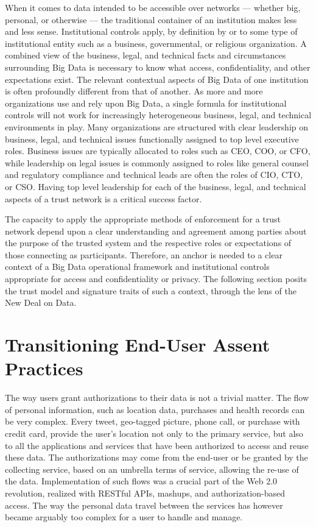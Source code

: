 When it comes to data intended to be accessible over networks --- whether big, personal, or otherwise --- the traditional container of an institution makes less and less sense.
Institutional controls apply, by definition by or to some type of institutional entity such as a business, governmental, or religious organization.
A combined view of the business, legal, and technical facts and circumstances surrounding Big Data is necessary to know what access, confidentiality, and other expectations exist.
The relevant contextual aspects of Big Data of one institution is often profoundly different from that of another.
As more and more organizations use and rely upon Big Data, a single formula for institutional controls will not work for increasingly heterogeneous business, legal, and technical environments in play.
Many organizations are structured with clear leadership on business, legal, and technical issues functionally assigned to top level executive roles. 
Business issues are typically allocated to roles such as CEO, COO, or CFO, while leadership on legal issues is commonly assigned to roles like general counsel and regulatory compliance and technical leads are often the roles of CIO, CTO, or CSO.
Having top level leadership for each of the business, legal, and technical aspects of a trust network is a critical success factor.

The capacity to apply the appropriate methods of enforcement for a trust network depend upon a clear understanding and agreement among parties about the purpose of the trusted system and the respective roles or expectations of those connecting as participants.
Therefore, an anchor is needed to a clear context of a Big Data operational framework and institutional controls appropriate for access and confidentiality or privacy.
The following section posits the trust model and signature traits of such a context, through the lens of the New Deal on Data.

\section{Transitioning End-User Assent Practices }

The way users grant authorizations to their data is not a trivial matter.
The flow of personal information, such as location data, purchases and health records can be very complex.
Every tweet, geo-tagged picture, phone call, or purchase with credit card, provide the user's location not only to the primary service, but also to all the applications and services that have been authorized to access and reuse these data.
The authorizations may come from the end-user or be granted by the collecting service, based on an umbrella terms of service, allowing the re-use of the data.
Implementation of such flows was a crucial part of the Web 2.0 revolution, realized with RESTful APIs, mashups, and authorization-based access.
The way the personal data travel between the services has however became arguably too complex for a user to handle and manage.


